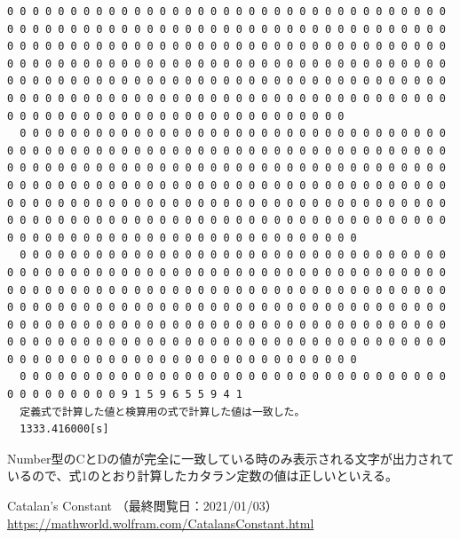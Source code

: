 \documentclass[a4j,dvipdfmx,titlepage]{jarticle}
\begin{document}
\begin{lstlisting}[caption=実行結果,label=kekka]
  0 0 0 0 0 0 0 0 0 0 0 0 0 0 0 0 0 0 0 0 0 0 0 0 0 0 0 0 0 0 0 0 0 0 0 0 0 0 0 0 0 0 0 0 0 0 0 0 0 0 0 0 0 0 0 0 0 0 0 0 0 0 0 0 0 0 0 0 0 0 0 0 0 0 0 0 0 0 0 0 0 0 0 0 0 0 0 0 0 0 0 0 0 0 0 0 0 0 0 0 0 0 0 0 0 0 0 0 0 0 0 0 0 0 0 0 0 0 0 0 0 0 0 0 0 0 0 0 0 0 0 0 0 0 0 0 0 0 0 0 0 0 0 0 0 0 0 0 0 0 0 0 0 0 0 0 0 0 0 0 0 0 0 0 0 0 0 0 0 0 0 0 0 0 0 0 0 0 0 0 0 0 0 0 0 0 0 0 0 0 0 0 0 0 0 0 0 0 0 0 0 0 0 0 0 0 0 0 0 0 0 0 0 0 0 0 0 0 0 0 0 0 0 0 0 0 0 0 0 0 0 0 0 0 0 0 0 
  0 0 0 0 0 0 0 0 0 0 0 0 0 0 0 0 0 0 0 0 0 0 0 0 0 0 0 0 0 0 0 0 0 0 0 0 0 0 0 0 0 0 0 0 0 0 0 0 0 0 0 0 0 0 0 0 0 0 0 0 0 0 0 0 0 0 0 0 0 0 0 0 0 0 0 0 0 0 0 0 0 0 0 0 0 0 0 0 0 0 0 0 0 0 0 0 0 0 0 0 0 0 0 0 0 0 0 0 0 0 0 0 0 0 0 0 0 0 0 0 0 0 0 0 0 0 0 0 0 0 0 0 0 0 0 0 0 0 0 0 0 0 0 0 0 0 0 0 0 0 0 0 0 0 0 0 0 0 0 0 0 0 0 0 0 0 0 0 0 0 0 0 0 0 0 0 0 0 0 0 0 0 0 0 0 0 0 0 0 0 0 0 0 0 0 0 0 0 0 0 0 0 0 0 0 0 0 0 0 0 0 0 0 0 0 0 0 0 0 0 0 0 0 0 0 0 0 0 0 0 0 0 0 0 0 0 0 
  0 0 0 0 0 0 0 0 0 0 0 0 0 0 0 0 0 0 0 0 0 0 0 0 0 0 0 0 0 0 0 0 0 0 0 0 0 0 0 0 0 0 0 0 0 0 0 0 0 0 0 0 0 0 0 0 0 0 0 0 0 0 0 0 0 0 0 0 0 0 0 0 0 0 0 0 0 0 0 0 0 0 0 0 0 0 0 0 0 0 0 0 0 0 0 0 0 0 0 0 0 0 0 0 0 0 0 0 0 0 0 0 0 0 0 0 0 0 0 0 0 0 0 0 0 0 0 0 0 0 0 0 0 0 0 0 0 0 0 0 0 0 0 0 0 0 0 0 0 0 0 0 0 0 0 0 0 0 0 0 0 0 0 0 0 0 0 0 0 0 0 0 0 0 0 0 0 0 0 0 0 0 0 0 0 0 0 0 0 0 0 0 0 0 0 0 0 0 0 0 0 0 0 0 0 0 0 0 0 0 0 0 0 0 0 0 0 0 0 0 0 0 0 0 0 0 0 0 0 0 0 0 0 0 0 0 0 
  0 0 0 0 0 0 0 0 0 0 0 0 0 0 0 0 0 0 0 0 0 0 0 0 0 0 0 0 0 0 0 0 0 0 0 0 0 0 0 0 0 0 0 9 1 5 9 6 5 5 9 4 1
  定義式で計算した値と検算用の式で計算した値は一致した。
  1333.416000[s]
\end{lstlisting}
Number型のCとDの値が完全に一致している時のみ表示される文字が出力されているので、式1のとおり計算したカタラン定数の値は正しいといえる。
\begin{thebibliography}{99}
   Catalan's Constant （最終閲覧日：2021/01/03）
  \\\url{https://mathworld.wolfram.com/CatalansConstant.html}
\end{thebibliography}
\end{document}
